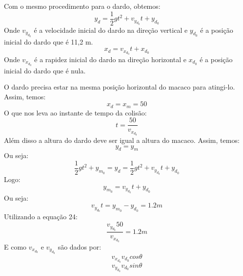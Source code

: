 \documentclass[12pt, a4paper]{article} %
\begin{document}
    Com o mesmo procedimento para o dardo, obtemos:
    \begin{equation}
        y_{d} = \frac{1}{2}gt^{2} + v_{y_{d_{0}}}t + y_{d_{0}}
    \end{equation}
    Onde $v_{y_{d_{0}}}$ \'e a velocidade inicial do dardo na dire\c{c}\~ao vertical e $y_{d_{0}}$ \'e a posi\c{c}\~ao inicial do dardo que \'e 11,2 m.
    \begin{equation}
        x_{d} = v_{x_{d_{0}}}t + x_{d_{0}}
    \end{equation}
    Onde $v_{x_{d_{0}}}$ \'e a rapidez inicial do dardo na dire\c{c}\~ao horizontal e $x_{d_{0}}$ \'e a posi\c{c}\~ao inicial do dardo que \'e nula.

    O dardo precisa estar na mesma posi\c{c}\~ao horizontal do macaco para atingi-lo. Assim, temos:
    \begin{equation}
        x_{d} = x_{m} = 50
    \end{equation}
    O que nos leva ao instante de tempo da colis\~ao:
    \begin{equation}
        t = \frac{50}{v_{x_{d_{0}}}}
    \end{equation}
    Al\'em disso a altura do dardo deve ser igual a altura do macaco. Assim, temos:
    \begin{equation}
        y_{d} = y_{m}
    \end{equation}
    Ou seja:
    \begin{equation}
        \frac{1}{2}gt^{2} + y_{m_{0}} = y_{d} = \frac{1}{2}gt^{2} + v_{y_{d_{0}}}t + y_{d_{0}}
    \end{equation}
    Logo:
    \begin{equation}
        y_{m_{0}} = v_{y_{d_{0}}}t + y_{d_{0}}
    \end{equation}
    Ou seja:
    \begin{equation}
        v_{y_{d_{0}}}t = y_{m_{0}} - y_{d_{0}} = 1.2m
    \end{equation}
    Utilizando a equa\c{c}\~ao 24:
    \begin{equation}
        \frac{v_{y_{d_{0}}}50}{v_{x_{d_{0}}}} = 1.2m
    \end{equation}
    E como $v_{x_{d_{0}}}$ e $v_{y_{d_{0}}}$ s\~ao dados por:
    \begin{equation}
        v_{x_{d_{0}}} v_{d_{0}} cos\theta
    \end{equation}
    \begin{equation}
        v_{y_{d_{0}}} v_{d_{0}} sin\theta
    \end{equation}
\end{document}
